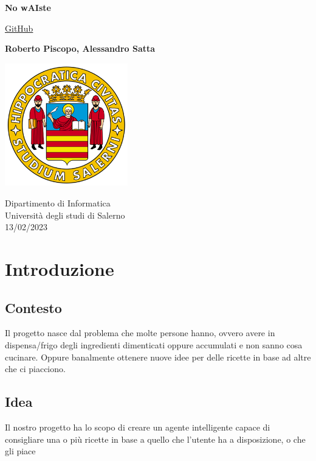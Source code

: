 \documentclass[12pt]{report}
\begin{document}
\begin{titlepage}
   \begin{center}
       \vspace*{5cm}

       \textbf{\huge{No wAIste}}

       \vspace{0.5cm}
        \href{https://github.com/UniRoby/Recipe_Suggester_RSAI}{GitHub}
            
       \vspace{1.5cm}

       \textbf{Roberto Piscopo, Alessandro Satta}

       \vfill

    
     
       \includegraphics[width=0.4\textwidth]{img/logo.png}
            
       Dipartimento di Informatica\\
       Università degli studi di Salerno\\
       13/02/2023         
   \end{center}
\end{titlepage}

\tableofcontents

\chapter{Introduzione}
\section{Contesto}    
Il progetto nasce dal problema che molte persone hanno, ovvero avere in dispensa/frigo degli ingredienti dimenticati oppure accumulati e non sanno cosa cucinare. Oppure banalmente ottenere nuove idee per delle ricette in base ad altre che ci piacciono.

\section{Idea}
Il nostro progetto ha lo scopo di creare un agente intelligente capace di consigliare una o più ricette in base a quello che l’utente ha a disposizione, o che gli piace 
\end{document}
